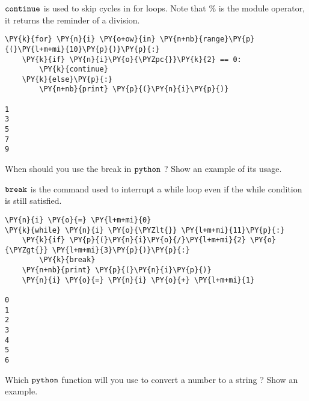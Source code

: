 \begin{Answer}
\(\tt{continue}\) is used to skip cycles in for loops. Note that \% is
the module operator, it returns the reminder of a division.

\begin{tcolorbox}[size=fbox, boxrule=1pt, colback=cellbackground, colframe=cellborder]
\begin{Verbatim}[commandchars=\\\{\}]
\PY{k}{for} \PY{n}{i} \PY{o+ow}{in} \PY{n+nb}{range}\PY{p}{(}\PY{l+m+mi}{10}\PY{p}{)}\PY{p}{:}
    \PY{k}{if} \PY{n}{i}\PY{o}{\PYZpc{}}\PY{k}{2} == 0:
        \PY{k}{continue}
    \PY{k}{else}\PY{p}{:}
        \PY{n+nb}{print} \PY{p}{(}\PY{n}{i}\PY{p}{)}

1
3
5
7
9
\end{Verbatim}
\end{tcolorbox}
\end{Answer}

\begin{Exercise}
When should you use the break in \(\tt{python}\) ? Show an example of its usage.
\end{Exercise}

\begin{Answer}
\(\tt{break}\) is the command used to interrupt a while loop even if the
while condition is still satisfied.

\begin{tcolorbox}[size=fbox, boxrule=1pt, colback=cellbackground, colframe=cellborder]
\begin{Verbatim}[commandchars=\\\{\}]
\PY{n}{i} \PY{o}{=} \PY{l+m+mi}{0}
\PY{k}{while} \PY{n}{i} \PY{o}{\PYZlt{}} \PY{l+m+mi}{11}\PY{p}{:}
    \PY{k}{if} \PY{p}{(}\PY{n}{i}\PY{o}{/}\PY{l+m+mi}{2} \PY{o}{\PYZgt{}} \PY{l+m+mi}{3}\PY{p}{)}\PY{p}{:}
        \PY{k}{break}
    \PY{n+nb}{print} \PY{p}{(}\PY{n}{i}\PY{p}{)}
    \PY{n}{i} \PY{o}{=} \PY{n}{i} \PY{o}{+} \PY{l+m+mi}{1}

0
1
2
3
4
5
6
\end{Verbatim}
\end{tcolorbox}  
\end{Answer}

\begin{Exercise}
Which \(\tt{python}\) function will you use to convert a number to a string ? Show an example.
\end{Exercise}

